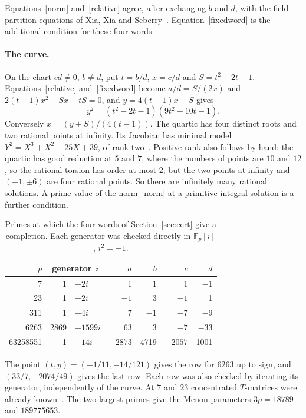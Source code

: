 \documentclass[11pt]{article}
\theoremstyle{remark}
\newcommand{\F}{\mathbb F}
\begin{document}
Equations~\eqref{norm} and~\eqref{relative} agree, after exchanging $b$ and $d$, with the field partition equations of Xia, Xia and Seberry~\cite{XXS21}. Equation~\eqref{fixedword} is the additional condition for these four words.

\paragraph{The curve.}
On the chart $cd\ne0$, $b\ne d$, put $t=b/d$, $x=c/d$ and $S=t^2-2t-1$. Equations~\eqref{relative} and~\eqref{fixedword} become $a/d=S/(2x)$ and $2(t-1)x^2-Sx-tS=0$, and $y=4(t-1)x-S$ gives
\begin{equation}\label{curve}
 y^2=(t^2-2t-1)(9t^2-10t-1).
\end{equation}
Conversely $x=(y+S)/(4(t-1))$. The quartic has four distinct roots and two rational points at infinity. Its Jacobian has minimal model $Y^2=X^3+X^2-25X+39$, of rank two~\cite{LMFDB}. Positive rank also follows by hand: the quartic has good reduction at $5$ and $7$, where the numbers of points are $10$ and $12$, so the rational torsion has order at most $2$; but the two points at infinity and $(-1,\pm6)$ are four rational points. So there are infinitely many rational solutions. A prime value of the norm~\eqref{norm} at a primitive integral solution is a further condition.

\begin{table}[ht]
\centering
\begin{tabular}{rr@{\;}lrrrr}
\toprule
$p$&\multicolumn{2}{c}{generator $z$}&$a$&$b$&$c$&$d$\\
\midrule
7&1&$+2i$&1&1&1&$-1$\\
23&1&$+2i$&$-1$&3&$-1$&1\\
311&1&$+4i$&7&$-1$&$-7$&$-9$\\
6263&2869&$+1599i$&63&3&$-7$&$-33$\\
63258551&1&$+14i$&$-2873$&4719&$-2057$&1001\\
\bottomrule
\end{tabular}
\caption{Primes at which the four words of Section~\ref{sec:cert} give a completion. Each generator was checked directly in $\F_p[i]$, $i^2=-1$.}\label{tab:norms}
\end{table}

The point $(t,y)=(-1/11,-14/121)$ gives the row for $6263$ up to sign, and $(33/7,-2074/49)$ gives the last row. Each row was also checked by iterating its generator, independently of the curve. At $7$ and $23$ concentrated $T$-matrices were already known~\cite{XXS}. The two largest primes give the Menon parameters $3p=18789$ and $189775653$.
\end{document}
